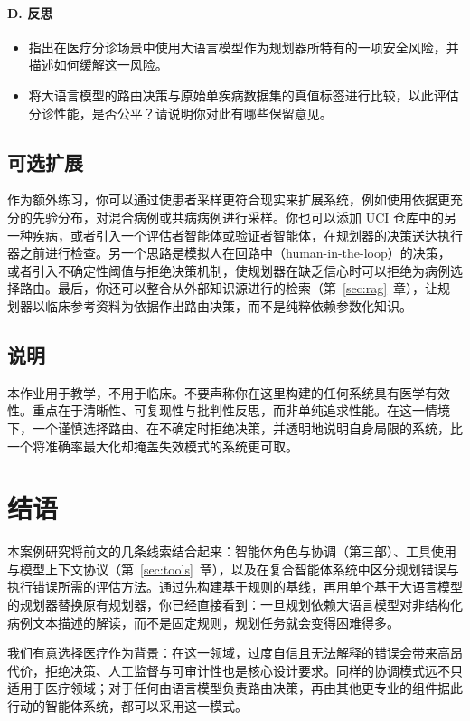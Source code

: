 \paragraph{D. 反思}
\begin{itemize}
    \item 指出在医疗分诊场景中使用大语言模型作为规划器所特有的一项安全风险，并描述如何缓解这一风险。
    \item 将大语言模型的路由决策与原始单疾病数据集的真值标签进行比较，以此评估分诊性能，是否公平？请说明你对此有哪些保留意见。
\end{itemize}


\subsection*{可选扩展}

作为额外练习，你可以通过使患者采样更符合现实来扩展系统，例如使用依据更充分的先验分布，对混合病例或共病病例进行采样。你也可以添加 UCI 仓库中的另一种疾病，或者引入一个评估者智能体或验证者智能体，在规划器的决策送达执行器之前进行检查。另一个思路是模拟人在回路中（human-in-the-loop）的决策，或者引入不确定性阈值与拒绝决策机制，使规划器在缺乏信心时可以拒绝为病例选择路由。最后，你还可以整合从外部知识源进行的检索（第~\ref{sec:rag}~章），让规划器以临床参考资料为依据作出路由决策，而不是纯粹依赖参数化知识。


\subsection*{说明}

本作业用于教学，不用于临床。不要声称你在这里构建的任何系统具有医学有效性。重点在于清晰性、可复现性与批判性反思，而非单纯追求性能。在这一情境下，一个谨慎选择路由、在不确定时拒绝决策，并透明地说明自身局限的系统，比一个将准确率最大化却掩盖失效模式的系统更可取。


\section{结语}

本案例研究将前文的几条线索结合起来：智能体角色与协调（第三部）、工具使用与模型上下文协议（第~\ref{sec:tools}~章），以及在复合智能体系统中区分规划错误与执行错误所需的评估方法。通过先构建基于规则的基线，再用单个基于大语言模型的规划器替换原有规划器，你已经直接看到：一旦规划依赖大语言模型对非结构化病例文本描述的解读，而不是固定规则，规划任务就会变得困难得多。

我们有意选择医疗作为背景：在这一领域，过度自信且无法解释的错误会带来高昂代价，拒绝决策、人工监督与可审计性也是核心设计要求。同样的协调模式远不只适用于医疗领域；对于任何由语言模型负责路由决策，再由其他更专业的组件据此行动的智能体系统，都可以采用这一模式。






